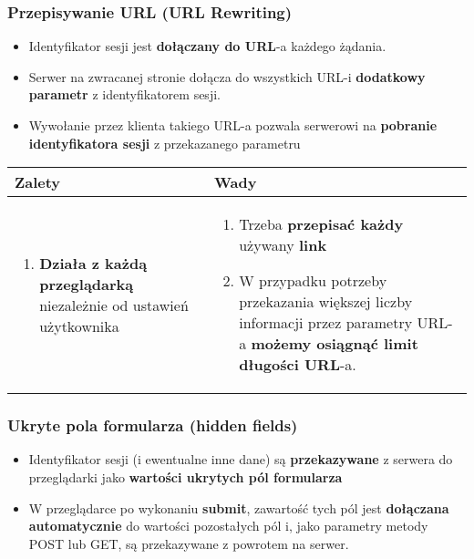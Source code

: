 \documentclass[../main.tex]{subfiles}
\begin{document}
    \subsubsection{Przepisywanie URL (URL Rewriting)}
    \begin{itemize}
        \item Identyfikator sesji jest \textbf{dołączany do URL}-a każdego żądania.
        \item Serwer na zwracanej stronie dołącza do wszystkich URL-i \textbf{dodatkowy parametr} z identyfikatorem sesji.
        \item Wywołanie przez klienta takiego URL-a pozwala serwerowi na \textbf{pobranie identyfikatora sesji} z przekazanego parametru
    \end{itemize}

    \begin{table}[H]
        \begin{center}
            \begin{tabular}{p{8cm} | p{8cm}}
                \textbf{Zalety} & \textbf{Wady}\\
                \hline
                \begin{enumerate}
                    \item \textbf{Działa z każdą przeglądarką} niezależnie od ustawień użytkownika
                \end{enumerate}
                &
                \begin{enumerate}
                    \item Trzeba \textbf{przepisać każdy} używany \textbf{link}
                    \item W przypadku potrzeby przekazania większej liczby informacji przez parametry URL-a \textbf{możemy osiągnąć limit długości URL}-a.
                \end{enumerate}\\
            \end{tabular}
        \end{center}
    \end{table}

    \subsubsection{Ukryte pola formularza (hidden fields)}
    \begin{itemize}
        \item Identyfikator sesji (i ewentualne inne dane) są \textbf{przekazywane} z serwera do przeglądarki jako \textbf{wartości ukrytych pól formularza}
        \item W przeglądarce po wykonaniu \textbf{submit}, zawartość tych pól jest \textbf{dołączana automatycznie} do wartości pozostałych pól i, jako parametry metody POST lub
        GET, są przekazywane z powrotem na serwer.
    \end{itemize}
\end{document}
